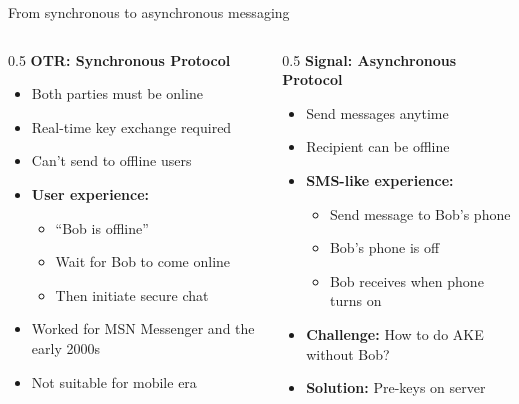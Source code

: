 \ifdefined\PRESENTATION\else\PassOptionsToClass{handout}{beamer}\fi\documentclass[aspectratio=169, lualatex]{beamer}
\begin{document}
\begin{frame}{From synchronous to asynchronous messaging}
	\begin{columns}
		\begin{column}{0.5\textwidth}
			\textbf{OTR: Synchronous Protocol}
			\begin{itemize}
				\item Both parties must be online
				\item Real-time key exchange required
				\item Can't send to offline users
				\item \textbf{User experience:}
				      \begin{itemize}
					      \item ``Bob is offline''
					      \item Wait for Bob to come online
					      \item Then initiate secure chat
				      \end{itemize}
				\item Worked for MSN Messenger and the early 2000s
				\item Not suitable for mobile era
			\end{itemize}
		\end{column}
		\begin{column}{0.5\textwidth}
			\textbf{Signal: Asynchronous Protocol}
			\begin{itemize}
				\item Send messages anytime
				\item Recipient can be offline
				\item \textbf{SMS-like experience:}
				      \begin{itemize}
					      \item Send message to Bob's phone
					      \item Bob's phone is off
					      \item Bob receives when phone turns on
				      \end{itemize}
				\item \textbf{Challenge:} How to do AKE without Bob?
				\item \textbf{Solution:} Pre-keys on server
			\end{itemize}
		\end{column}
	\end{columns}
\end{frame}
\end{document}
